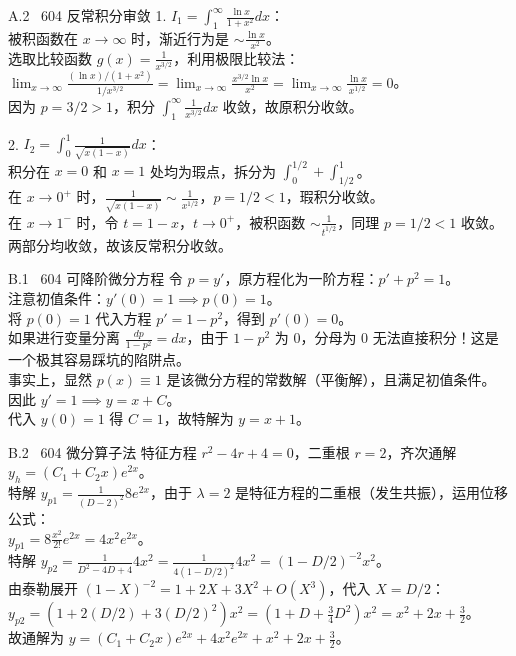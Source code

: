 \documentclass[a4paper,11pt]{article}
\begin{document}
\begin{solution}{A.2 \textbar\ 604 反常积分审敛}
1. $I_1 = \int_1^{\infty} \frac{\ln x}{1+x^2} dx$：\\
被积函数在 $x \to \infty$ 时，渐近行为是 $\sim \frac{\ln x}{x^2}$。\\
选取比较函数 $g(x) = \frac{1}{x^{3/2}}$，利用极限比较法：
$\lim_{x \to \infty} \frac{(\ln x)/(1+x^2)}{1/x^{3/2}} = \lim_{x \to \infty} \frac{x^{3/2}\ln x}{x^2} = \lim_{x \to \infty} \frac{\ln x}{x^{1/2}} = 0$。\\
因为 $p=3/2 > 1$，积分 $\int_1^\infty \frac{1}{x^{3/2}} dx$ 收敛，故原积分收敛。

2. $I_2 = \int_0^1 \frac{1}{\sqrt{x(1-x)}} dx$：\\
积分在 $x=0$ 和 $x=1$ 处均为瑕点，拆分为 $\int_0^{1/2} + \int_{1/2}^1$。\\
在 $x \to 0^+$ 时，$\frac{1}{\sqrt{x(1-x)}} \sim \frac{1}{x^{1/2}}$，$p=1/2 < 1$，瑕积分收敛。\\
在 $x \to 1^-$ 时，令 $t=1-x$，$t \to 0^+$，被积函数 $\sim \frac{1}{t^{1/2}}$，同理 $p=1/2 < 1$ 收敛。\\
两部分均收敛，故该反常积分收敛。
\end{solution}

\begin{solution}{B.1 \textbar\ 604 可降阶微分方程}
令 $p = y'$，原方程化为一阶方程：$p' + p^2 = 1$。\\
注意初值条件：$y'(0)=1 \implies p(0)=1$。\\
将 $p(0)=1$ 代入方程 $p' = 1 - p^2$，得到 $p'(0) = 0$。\\
如果进行变量分离 $\frac{dp}{1-p^2} = dx$，由于 $1-p^2$ 为 0，分母为 0 无法直接积分！这是一个极其容易踩坑的陷阱点。\\
事实上，显然 $p(x) \equiv 1$ 是该微分方程的常数解（平衡解），且满足初值条件。\\
因此 $y' = 1 \implies y = x + C$。\\
代入 $y(0)=1$ 得 $C=1$，故特解为 $y = x + 1$。
\end{solution}

\begin{solution}{B.2 \textbar\ 604 微分算子法}
特征方程 $r^2 - 4r + 4 = 0$，二重根 $r=2$，齐次通解 $y_h = (C_1 + C_2 x)e^{2x}$。\\
特解 $y_{p1} = \frac{1}{(D-2)^2} 8e^{2x}$，由于 $\lambda=2$ 是特征方程的二重根（发生共振），运用位移公式：\\
$y_{p1} = 8 \frac{x^2}{2!} e^{2x} = 4x^2 e^{2x}$。\\
特解 $y_{p2} = \frac{1}{D^2 - 4D + 4} 4x^2 = \frac{1}{4(1 - D/2)^2} 4x^2 = (1 - D/2)^{-2} x^2$。\\
由泰勒展开 $(1-X)^{-2} = 1 + 2X + 3X^2 + O(X^3)$，代入 $X = D/2$：\\
$y_{p2} = (1 + 2(D/2) + 3(D/2)^2) x^2 = (1 + D + \frac{3}{4}D^2) x^2 = x^2 + 2x + \frac{3}{2}$。\\
故通解为 $y = (C_1 + C_2 x)e^{2x} + 4x^2 e^{2x} + x^2 + 2x + \frac{3}{2}$。
\end{solution}
\end{document}
